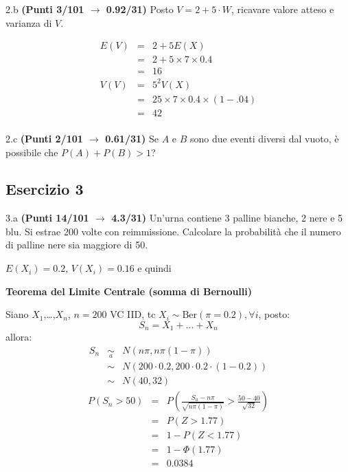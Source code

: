 \documentclass[
  11pt,
]{book}
\theoremstyle{mytheoremstyle}
\theoremstyle{mydefstyle}
\newenvironment{sol}
  {
  \begin{tcolorbox}[enhanced,breakable,arc=0.1mm,boxrule=1pt,colback=white,colframe=iblue,
  title=\bf \fontfamily{lmss}\selectfont \hspace{.5 cm} Soluzione,drop fuzzy shadow]

}{
\end{tcolorbox}
  }
\begin{document}
2.b \textbf{(Punti 3/101 \(\rightarrow\) 0.92/31)} Posto \(V=2+5\cdot W\), ricavare valore atteso e varianza di \(V\).

\begin{sol}
\begin{eqnarray*}
  E(V) &=& 2+5E(X)  \\
  &=& 2+5\times 7 \times 0.4\\
  &=& 16\\
  V(V) &=& 5^2V(X)  \\
  &=& 25\times 7\times 0.4\times (1-.04)\\
  &=& 42\\
\end{eqnarray*}

\end{sol}

2.c \textbf{(Punti 2/101 \(\rightarrow\) 0.61/31)} Se \(A\) e \(B\) sono due eventi diversi dal vuoto, è possibile che \(P(A)+P(B)>1\)?

\subsection{Esercizio 3}\label{esercizio-3-11}

3.a \textbf{(Punti 14/101 \(\rightarrow\) 4.3/31)} Un'urna contiene 3 palline bianche, 2 nere e 5 blu. Si estrae 200 volte con reimmissione.
Calcolare la probabilità che il numero di palline nere sia maggiore di 50.

\(E(X_i)=0.2\), \(V(X_i)=0.16\) e quindi

\textbf{Teorema del Limite Centrale (somma di Bernoulli)}

Siano \(X_1\),\ldots,\(X_n\), \(n=200\) VC IID, tc \(X_i\sim\text{Ber}(\pi=0.2)\)\(,\forall i\), posto:
\[
      S_n = X_1 + ... + X_n
      \]
allora:\begin{eqnarray*}
  S_n & \mathop{\sim}\limits_{a}& N(n\pi,n\pi(1-\pi)) \\
      &\sim & N(200\cdot0.2,200\cdot0.2\cdot(1-0.2)) \\
      &\sim & N(40,32)
  \end{eqnarray*}\begin{eqnarray*}
      P( S_n   >   50 ) 
        &=& P\left(  \frac { S_n  -  n\pi }{ \sqrt{n\pi(1-\pi)} }  >  \frac { 50  -  40 }{\sqrt{ 32 }} \right)  \\
                 &=& P\left(  Z   >   1.77 \right) \\    &=& 1-P(Z< 1.77 )\\ 
                 &=&  1-\Phi( 1.77 ) \\ &=&  0.0384 
      \end{eqnarray*}
\end{document}
